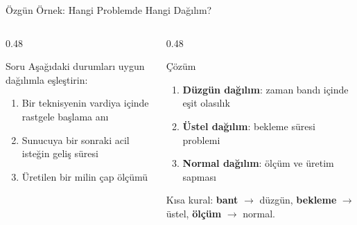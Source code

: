 \documentclass[light]{lutbeamer}
\begin{document}
\begin{frame}{Özgün Örnek: Hangi Problemde Hangi Dağılım?}
\small
\begin{columns}[T,onlytextwidth]
    \begin{column}{0.48\textwidth}
        \begin{block}{Soru}
            Aşağıdaki durumları uygun dağılımla eşleştirin:
            \begin{enumerate}
                \item Bir teknisyenin vardiya içinde rastgele başlama anı
                \item Sunucuya bir sonraki acil isteğin geliş süresi
                \item Üretilen bir milin çap ölçümü
            \end{enumerate}
        \end{block}
    \end{column}
    \begin{column}{0.48\textwidth}
        \begin{exampleblock}{Çözüm}
            \begin{enumerate}
                \item \textbf{Düzgün dağılım}: zaman bandı içinde eşit olasılık
                \item \textbf{Üstel dağılım}: bekleme süresi problemi
                \item \textbf{Normal dağılım}: ölçüm ve üretim sapması
            \end{enumerate}

            \vspace{0.15cm}
            Kısa kural:
            \textbf{bant} $\to$ düzgün,\;
            \textbf{bekleme} $\to$ üstel,\;
            \textbf{ölçüm} $\to$ normal.
        \end{exampleblock}
    \end{column}
\end{columns}
\end{frame}
\end{document}
